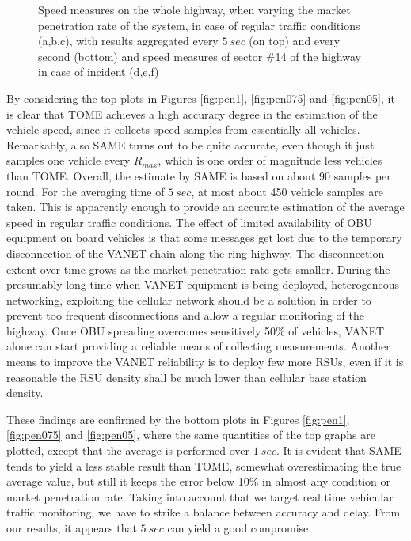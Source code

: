 \documentclass[conference]{IEEEtran}
\begin{document}
\begin{figure}[tbhp]
\begin{center}
\caption{Speed measures on the whole highway, when varying the market penetration rate of the system, in case of regular traffic conditions (a,b,c), with results aggregated every $5~sec$ (on top) and every second (bottom) and speed measures of sector \#14 of the highway in case of incident (d,e,f)}
\label{fig:penetration}
\end{center}
\end{figure}
By considering the top plots in Figures \ref{fig:pen1}, \ref{fig:pen075} and \ref{fig:pen05}, it is clear that TOME achieves a high accuracy degree in the estimation of the vehicle speed, since it collects speed samples from essentially all vehicles. Remarkably, also SAME turns out to be quite accurate, even though it just samples one vehicle every $R_{max}$, which is one order of magnitude less vehicles than TOME. Overall, the estimate by SAME is based on about 90 samples per round. For the averaging time of $5~sec$, at most about 450 vehicle samples are taken. This is apparently enough to provide an accurate estimation of the average speed in regular traffic conditions. The effect of limited availability of OBU equipment on board vehicles is that some messages get lost due to the temporary disconnection of the VANET chain along the ring highway. The disconnection extent over time grows as the market penetration rate gets smaller. During the presumably long time when VANET equipment is being deployed, heterogeneous networking, exploiting the cellular network should be a solution in order to prevent too frequent disconnections and allow a regular monitoring of the highway. Once OBU spreading overcomes sensitively 50\% of vehicles, VANET alone can start providing a reliable means of collecting measurements. Another means to improve the VANET reliability is to deploy few more RSUs, even if it is reasonable the RSU density shall be much lower than cellular base station density.

These findings are confirmed by the bottom plots in Figures \ref{fig:pen1}, \ref{fig:pen075} and \ref{fig:pen05}, where the same quantities of the top graphs are plotted, except that the average is performed over $1~sec$. It is evident that SAME tends to yield a less stable result than TOME, somewhat overestimating the true average value, but still it keeps the error below 10\% in almost any condition or market penetration rate. Taking into account that we target real time vehicular traffic monitoring, we have to strike a balance between accuracy and delay. From our results, it appears that $5~sec$ can yield a good compromise.
\end{document}
